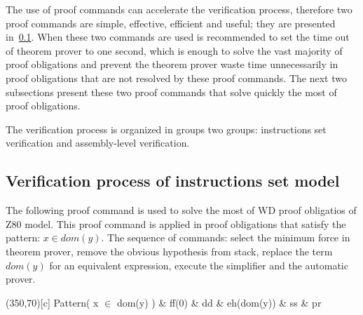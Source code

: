 \documentclass[11pt]{article} %
\begin{document}
The use of proof commands can accelerate the verification process, therefore two
proof commands are simple, effective, efficient and useful; they are presented
in~\ref{subsection:VerificationInstructions}. When these two commands are used is
recommended to set the time out of theorem prover to one second, which is enough
to solve the vast majority of proof obligations and prevent the theorem prover
waste time unnecessarily in proof obligations that are not resolved by these
proof commands. The next two subsections present these two proof commands that
solve quickly the most of proof obligations.




The verification process is organized in groups two groups: instructions set
verification and assembly-level verification.

\subsection{Verification process of instructions set model} 
\label{subsection:VerificationInstructions}
The following proof command is used to solve the most of WD proof obligatios of
Z80 model. This proof command is applied in proof obligations that satisfy the pattern: $x \in dom(y)$.
The sequence of commands: select the minimum force in theorem prover, remove the obvious hypothesis from stack, 
replace the term $dom(y)$ for an equivalent expression, execute the simplifier
and the automatic prover.


\begin{center}
\framebox(350,70)[c]{ Pattern( x $\in$ dom(y) ) \& ff(0) \& dd \& eh(dom(y)) \& ss \& pr }
\end{center}
\end{document}
